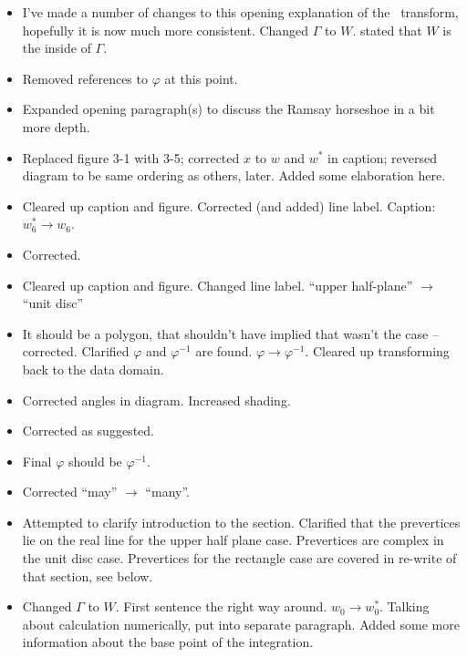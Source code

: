 \begin{itemize}
\item I've made a number of changes to this opening explanation of the \sch\ transform, hopefully it is now much more consistent.  Changed $\Gamma$ to $W$.  stated that $W$ is the inside of $\Gamma$.
\item {} Removed references to $\varphi$ at this point.
\item {} Expanded opening paragraph(s) to discuss the Ramsay horseshoe in a bit more depth.
\item {} Replaced figure 3-1 with 3-5; corrected $x$ to $w$ and $w^*$ in caption; reversed diagram to be same ordering as others, later.  Added some elaboration here.
\item {} Cleared up caption and figure. Corrected (and added) line label. Caption: $w_6^* \rightarrow w_6$. 
\item {} Corrected.
\item {} Cleared up caption and figure. Changed line label. ``upper half-plane'' $\rightarrow$ ``unit disc''
\item {} It should be a polygon, that shouldn't have implied that wasn't the case -- corrected.  Clarified $\varphi$ and $\varphi^{-1}$ are found.  $\varphi \rightarrow \varphi^{-1}$.  Cleared up transforming back to the data domain.
\item {} Corrected angles in diagram. Increased shading.
\item {} Corrected as suggested.
\item {} Final $\varphi$ should be $\varphi^{-1}$.
\item {} Corrected ``may'' $\rightarrow $ ``many''.
\item {} Attempted to clarify introduction to the section.  Clarified that the prevertices lie on the real line for the upper half plane case.  Prevertices are complex in the unit disc case.  Prevertices for the rectangle case are covered in re-write of that section, see below. 
\item {} Changed $\Gamma$ to $W$.  First sentence the right way around.  $w_0 \rightarrow w^*_0$.   Talking about calculation numerically, put into separate paragraph. Added some more information about the base point of the integration.

\end{itemize}
